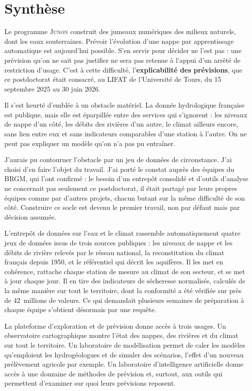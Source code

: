 \chapter*{Synthèse}

Le programme \textsc{Junon} construit des jumeaux numériques des milieux naturels, dont les eaux
souterraines. Prévoir l'évolution d'une nappe par apprentissage automatique est aujourd'hui
possible. S'en servir pour décider ne l'est pas : une prévision qu'on ne sait pas justifier ne
sera pas retenue à l'appui d'un arrêté de restriction d'usage. C'est à cette difficulté,
l'\textbf{explicabilité des prévisions}, que ce postdoctorat était consacré, au LIFAT de
l'Université de Tours, du 15 septembre 2025 au 30 juin 2026.

Il s'est heurté d'emblée à un obstacle matériel. La donnée hydrologique française est publique,
mais elle est éparpillée entre des services qui s'ignorent : les niveaux de nappe d'un côté, les
débits des rivières d'un autre, le climat ailleurs encore, sans lien entre eux et sans
indicateurs comparables d'une station à l'autre. On ne peut pas expliquer un modèle qu'on n'a
pas pu entraîner.

J'aurais pu contourner l'obstacle par un jeu de données de circonstance. J'ai choisi d'en faire
l'objet du travail. J'ai porté le constat auprès des équipes du BRGM, qui l'ont confirmé : le
besoin d'un entrepôt consolidé et d'outils d'analyse ne concernait pas seulement ce
postdoctorat, il était partagé par leurs propres équipes comme par d'autres projets, chacun
butant sur la même difficulté de son côté. Construire ce socle est devenu le premier travail,
non par défaut mais par décision assumée.

L'entrepôt de données sur l'eau et le climat rassemble automatiquement quatre jeux de données issus de trois sources publiques :
les niveaux de nappe et les débits de rivière relevés par le réseau national, la reconstitution
du climat français depuis 1950, et le référentiel qui décrit les aquifères. Il les met en
cohérence, rattache chaque station de mesure au climat de son secteur, et se met à jour chaque
jour. Il en tire des indicateurs de sécheresse normalisés, calculés de la même manière sur tout
le territoire, dont la conformité a été vérifiée sur près de \num{42}~millions de valeurs. Ce
qui demandait plusieurs semaines de préparation à chaque équipe s'obtient désormais par une
requête.

La plateforme d'exploration et de prévision donne accès à trois usages. Un observatoire
cartographique montre l'état des nappes, des rivières et du climat sur tout le territoire. Un
laboratoire de modélisation permet de caler les modèles qu'emploient les hydrogéologues et de
simuler des scénarios, l'effet d'un nouveau prélèvement agricole par exemple. Un laboratoire
d'intelligence artificielle donne accès à une douzaine de méthodes de prévision et, surtout, aux
outils qui permettent d'examiner sur quoi leurs prévisions reposent.

